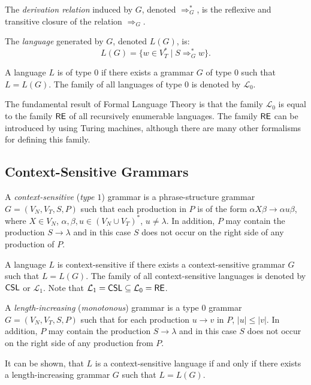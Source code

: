 The \emph{derivation relation} induced by $G$, denoted $\Rightarrow^*_G$, is the reflexive and transitive closure of the relation $\Rightarrow_G$.

The \emph{language} generated by $G$, denoted $L(G)$, is: $$L(G) = \{w \in V_T^* \mid S \Rightarrow^*_G w\}.$$

A language $L$ is of type $0$ if there exists a grammar $G$ of type $0$ such that $L = L(G)$. The family of all languages of type $0$ is denoted by $\mathcal{L}_0$.

The fundamental result of Formal Language Theory is that the family $\mathcal{L}_0$ is equal to the family \index{$\RE$}$\RE$ of all recursively enumerable languages. The family $\RE$ can be introduced by using Turing machines, although there are many other formalisms for defining this family.

\subsection{Context-Sensitive Grammars}
\label{subsection:context-sensitive-grammars}

A \emph{context-sensitive} (\emph{type $1$}) grammar is a phrase-structure grammar $G = (V_N, V_T, S, P)$ such that each production in $P$ is of the form $\alpha X \beta \to \alpha u \beta$, where $X \in V_N$, $\alpha, \beta, u \in (V_N \cup V_T)^*$, $u \neq \lambda$. In addition, $P$ may contain the production $S \to \lambda$ and in this case $S$ does not occur on the right side of any production of $P$.

A language $L$ is context-sensitive if there exists a context-sensitive grammar $G$ such that $L = L(G)$. The family of all context-sensitive languages is denoted by \index{$\CSL$}$\CSL$ or $\mathcal{L}_1$. Note that $\mathcal{L}_1 = \CSL \subseteq \mathcal{L}_0 = \RE$.

A \emph{length-increasing} (\emph{monotonous}) grammar is a type $0$ grammar $G = (V_N, V_T, S, P)$ such that for each production $u \to v$ in $P$, $|u| \le |v|$. In addition, $P$ may contain the production $S \to \lambda$ and in this case $S$ does not occur on the right side of any production from $P$.

It can be shown, that $L$ is a context-sensitive language if and only if there exists a length-increasing grammar $G$ such that $L = L(G)$.

